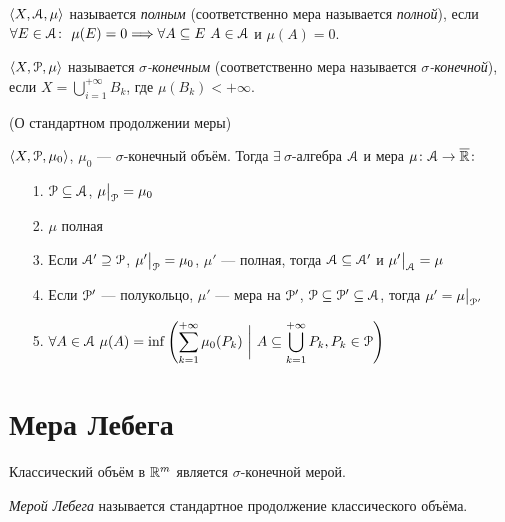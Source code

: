 \begin{definition}
    $\langle X, \mathcal{A}, \mu \rangle$ называется \textit{полным} (соответственно мера
    называется \textit{полной}), если $\forall E \in \mathcal{A} \colon~ \mu(E) = 0 \Longrightarrow
    \forall A \subseteq E~ A \in \mathcal{A}$ и $\mu(A) = 0$.
\end{definition}

\begin{definition}
    $\langle X, \mathcal{P}, \mu \rangle$ называется \textit{$\sigma$-конечным} (соответственно
    мера называется \textit{$\sigma$-конечной}), если $\displaystyle
    X = \bigcup_{i = 1}^{+\infty}{B_k}$, где $\mu(B_k) < +\infty$.
\end{definition}

\begin{theorem}(О стандартном продолжении меры)

    $\langle X, \mathcal{P}, \mu_0 \rangle$, $\mu_0$ --- $\sigma$-конечный объём. Тогда
    $\exists~ \sigma$-алгебра $\mathcal{A}$ и мера $\mu \colon \mathcal{A} \to \overline{\mathbb{R}}\colon$
    \begin{itemize}
        \item[1.] $\mathcal{P} \subseteq \mathcal{A}$, $\mu\big|_{\mathcal{P}} = \mu_0$
        \item[2.] $\mu$ полная
        \item[3.] Если $\mathcal{A}' \supseteq \mathcal{P}$, $\mu'\big|_{\mathcal{P}} = \mu_0$,
        $\mu'$ --- полная, тогда $\mathcal{A} \subseteq \mathcal{A}'$ и $\mu'\big|_{\mathcal{A}} = \mu$
        \item[4.] Если $\mathcal{P}'$ --- полукольцо, $\mu'$ --- мера на $\mathcal{P}'$,
        $\mathcal{P} \subseteq \mathcal{P}' \subseteq \mathcal{A}$, тогда $\mu' = \mu\big|_{\mathcal{P}'}$
        \item[5.] $\displaystyle \forall A \in \mathcal{A}~ \mu(A) =
        \inf{\left(\sum_{k = 1}^{+\infty}{\mu_0(P_k)} ~\bigg|~ A \subseteq \bigcup_{k = 1}
        ^{+\infty}{P_k}, P_k \in \mathcal{P}\right)}$
    \end{itemize}
\end{theorem}

\section{Мера Лебега}

\begin{theorem}
    Классический объём в $\mathbb{R}^m$ является $\sigma$-конечной мерой.
\end{theorem}

\begin{definition}
    \textit{Мерой Лебега} называется стандартное продолжение классического объёма.
\end{definition}

